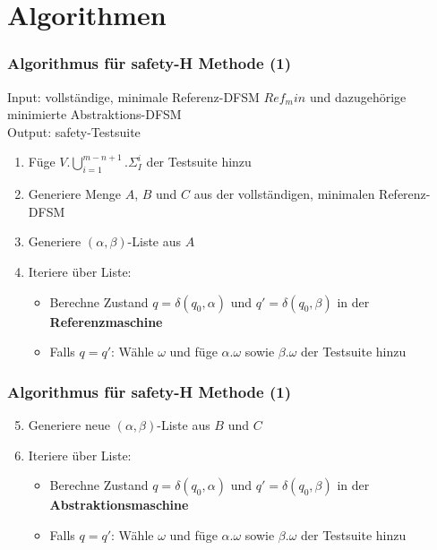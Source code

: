 \section{Algorithmen}

    
    \begin{frame}
    \frametitle{Algorithmus für safety-H Methode (1)}
    Input: vollständige, minimale Referenz-DFSM $Ref_min$ und dazugehörige minimierte Abstraktions-DFSM\\
    Output: safety-Testsuite
    \begin{enumerate}
      \item Füge $V.\bigcup\limits_{i=1}^{m-n+1}.\Sigma_I^i$ der Testsuite hinzu
      \item Generiere Menge $A$, $B$ und $C$ aus der vollständigen, minimalen Referenz-DFSM
      \item Generiere $(\alpha, \beta)$-Liste aus $A$
      \item Iteriere über Liste:
      \begin{itemize}
        \item Berechne Zustand $q = \delta(q_0,\alpha)$ und $q'=\delta(q_0,\beta)$ in der \textbf{Referenzmaschine}
        \item Falls $q = q'$: Wähle $\omega$ und füge $\alpha.\omega$ sowie $\beta.\omega$ der Testsuite hinzu
      \end{itemize}
    \end{enumerate}
    \end{frame}
    
    \begin{frame}
    \frametitle{Algorithmus für safety-H Methode (1)}
    \begin{enumerate}
      \setcounter{enumi}{4}
      \item Generiere neue $(\alpha, \beta)$-Liste aus $B$ und $C$
      \item Iteriere über Liste:
      \begin{itemize}
        \item Berechne Zustand $q = \delta(q_0,\alpha)$ und $q'=\delta(q_0,\beta)$ in der \textbf{Abstraktionsmaschine}
        \item Falls $q = q'$: Wähle $\omega$ und füge $\alpha.\omega$ sowie $\beta.\omega$ der Testsuite hinzu
      \end{itemize}
    \end{enumerate}
    \end{frame}
    
